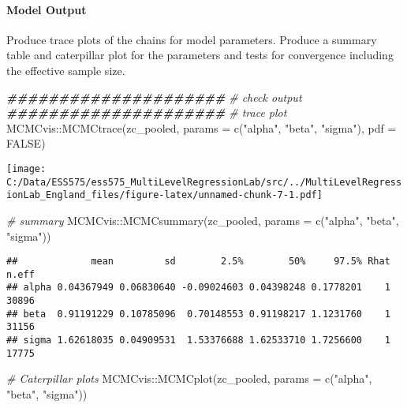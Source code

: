 \documentclass[
]{article}
\newenvironment{Shaded}{\begin{snugshade}}{\end{snugshade}}
\newcommand{\AttributeTok}[1]{\textcolor[rgb]{0.77,0.63,0.00}{#1}}
\newcommand{\CommentTok}[1]{\textcolor[rgb]{0.56,0.35,0.01}{\textit{#1}}}
\newcommand{\ConstantTok}[1]{\textcolor[rgb]{0.00,0.00,0.00}{#1}}
\newcommand{\DocumentationTok}[1]{\textcolor[rgb]{0.56,0.35,0.01}{\textbf{\textit{#1}}}}
\newcommand{\FunctionTok}[1]{\textcolor[rgb]{0.00,0.00,0.00}{#1}}
\newcommand{\NormalTok}[1]{#1}
\newcommand{\SpecialCharTok}[1]{\textcolor[rgb]{0.00,0.00,0.00}{#1}}
\newcommand{\StringTok}[1]{\textcolor[rgb]{0.31,0.60,0.02}{#1}}
\begin{document}
\hypertarget{model-output}{%
\paragraph{Model Output}\label{model-output}}

Produce trace plots of the chains for model parameters. Produce a
summary table and caterpillar plot for the parameters and tests for
convergence including the effective sample size.

\begin{Shaded}
\begin{Highlighting}[]
\DocumentationTok{\#\#\#\#\#\#\#\#\#\#\#\#\#\#\#\#\#\#\#\#\#}
\CommentTok{\# check output}
\DocumentationTok{\#\#\#\#\#\#\#\#\#\#\#\#\#\#\#\#\#\#\#\#\#}
\CommentTok{\# trace plot}
\NormalTok{MCMCvis}\SpecialCharTok{::}\FunctionTok{MCMCtrace}\NormalTok{(zc\_pooled, }\AttributeTok{params =} \FunctionTok{c}\NormalTok{(}\StringTok{"alpha"}\NormalTok{, }\StringTok{"beta"}\NormalTok{, }\StringTok{"sigma"}\NormalTok{), }\AttributeTok{pdf =} \ConstantTok{FALSE}\NormalTok{)}
\end{Highlighting}
\end{Shaded}

\texttt{[image: C:/Data/ESS575/ess575\_MultiLevelRegressionLab/src/../MultiLevelRegressionLab\_England\_files/figure-latex/unnamed-chunk-7-1.pdf]}

\begin{Shaded}
\begin{Highlighting}[]
\CommentTok{\# summary}
\NormalTok{MCMCvis}\SpecialCharTok{::}\FunctionTok{MCMCsummary}\NormalTok{(zc\_pooled, }\AttributeTok{params =} \FunctionTok{c}\NormalTok{(}\StringTok{"alpha"}\NormalTok{, }\StringTok{"beta"}\NormalTok{, }\StringTok{"sigma"}\NormalTok{))}
\end{Highlighting}
\end{Shaded}

\begin{verbatim}
##             mean         sd        2.5%        50%     97.5% Rhat n.eff
## alpha 0.04367949 0.06830640 -0.09024603 0.04398248 0.1778201    1 30896
## beta  0.91191229 0.10785096  0.70148553 0.91198217 1.1231760    1 31156
## sigma 1.62618035 0.04909531  1.53376688 1.62533710 1.7256600    1 17775
\end{verbatim}

\begin{Shaded}
\begin{Highlighting}[]
\CommentTok{\# Caterpillar plots}
\NormalTok{MCMCvis}\SpecialCharTok{::}\FunctionTok{MCMCplot}\NormalTok{(zc\_pooled, }\AttributeTok{params =} \FunctionTok{c}\NormalTok{(}\StringTok{"alpha"}\NormalTok{, }\StringTok{"beta"}\NormalTok{, }\StringTok{"sigma"}\NormalTok{))}
\end{Highlighting}
\end{Shaded}
\end{document}
